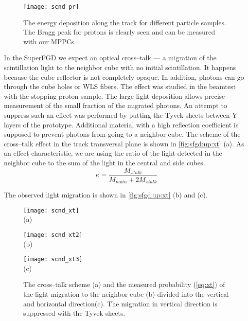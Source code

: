 \documentclass[main.tex]{subfiles}
\begin{document}
\begin{figure}[!ht]
	\centering
	\texttt{[image: scnd\_pr]}
	\caption{The energy deposition along the track for different particle samples. The Bragg peak for protons is clearly seen and can be measured with our MPPCs.}
	\label{fig:up:sfgd:scnd_pr}
\end{figure}

In the SuperFGD we expect an optical cross--talk --- a migration of the scintillation light to the neighbor cube with no initial scintillation. It happens because the cube reflector is not completely opaque. In addition, photons can go through the cube holes or WLS fibers. The effect was studied in the beamtest with the stopping proton sample. The large light deposition allows precise measurement of the small fraction of the migrated photons. An attempt to suppress such an effect was performed by putting the Tyvek sheets between Y layers of the prototype. Additional material with a high reflection coefficient is supposed to prevent photons from going to a neighbor cube. The scheme of the cross--talk effect in the track transversal plane is shown in \autoref{fig:sfgd:up:xt} (a). As an effect characteristic, we are using the ratio of the light detected in the neighbor cube to the sum of the light in the central and side cubes.
\begin{equation}
\label{eq:xt}
\kappa=\frac{M_{xtalk}}{M_{main}+2M_{xtalk}}
\end{equation}

The observed light migration is shown in \autoref{fig:sfgd:up:xt} (b) and (c).

\begin{figure}[!ht]
	\centering
	\begin{minipage}{0.33\linewidth}
		\centering
		\texttt{[image: scnd\_xt]} \\ (a)
	\end{minipage}
	\begin{minipage}{0.33\linewidth}
		\centering
		\texttt{[image: scnd\_xt2]} \\ (b)
	\end{minipage}
	\begin{minipage}{0.33\linewidth}
		\centering
		\texttt{[image: scnd\_xt3]} \\ (c)
	\end{minipage}
	\caption{The cross--talk scheme (a) and the measured probability (\autoref{eq:xt}) of the light migration to the neighbor cube (b) divided into the vertical and horizontal direction(c). The migration in vertical direction is suppressed with the Tyvek sheets.}
	\label{fig:sfgd:up:xt}
\end{figure}
\end{document}
